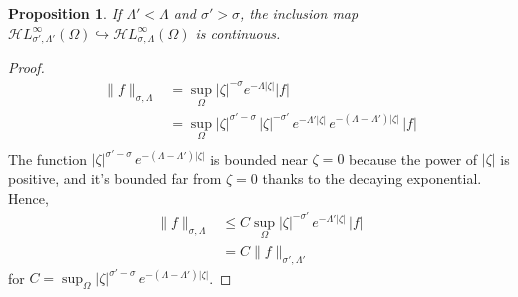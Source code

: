 \documentclass{article}
\theoremstyle{plain}
\newtheorem{prop}{Proposition}
\newcommand{\singexp}[2]{\mathcal{H}L^\infty_{#1, #2}}
\begin{document}
\begin{prop}
    If $\Lambda'<\Lambda$ and $\sigma'>\sigma$, the inclusion map $\singexp{\sigma'}{\Lambda'}(\Omega)\hookrightarrow \singexp{\sigma}{\Lambda}(\Omega)$ is continuous.
\end{prop}

\begin{proof}
    \begin{align*}
        \|f\|_{\sigma,\Lambda}&=\sup_{\Omega} |\zeta|^{-\sigma}  e^{-\Lambda |\zeta|} |f|\\
        &= \sup_{\Omega} |\zeta|^{\sigma'-\sigma}\,|\zeta|^{-\sigma'}\,e^{-\Lambda'|\zeta|}\,  e^{-(\Lambda-\Lambda') |\zeta|} \, |f|\\
    \end{align*}
    The function $|\zeta|^{\sigma'-\sigma}\,  e^{-(\Lambda-\Lambda') |\zeta|}$ is bounded near $\zeta = 0$ because the power of $|\zeta|$ is positive, and it's bounded far from $\zeta = 0$ thanks to the decaying exponential. Hence,
    \begin{align*}
       \|f\|_{\sigma,\Lambda}&\leq C\sup_\Omega  |\zeta|^{-\sigma'}\, e^{-\Lambda'|\zeta|} \, |f|\\
        &=C \|f\|_{\sigma',\Lambda'}
    \end{align*}
    for $C = \sup_{\Omega}  |\zeta|^{\sigma'-\sigma}\,  e^{-(\Lambda-\Lambda') |\zeta|}$.
\end{proof}
\end{document}
